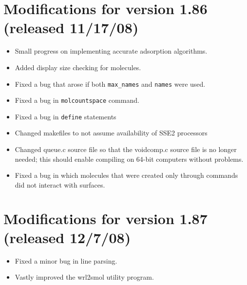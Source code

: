 \documentclass {scrbook}
\newcommand {\ttt} {\texttt}
\begin{document}
\section{Modifications for version 1.86 (released 11/17/08)}
\begin{itemize}
\item Small progress on implementing accurate adsorption algorithms.
\item Added display size checking for molecules.
\item Fixed a bug that arose if both \ttt{max\_names} and \ttt{names} were used.
\item Fixed a bug in \ttt{molcountspace} command.
\item Fixed a bug in \ttt{define} statements
\item Changed makefiles to not assume availability of SSE2 processors
\item Changed queue.c source file so that the voidcomp.c source file is no longer needed; this should enable compiling on 64-bit computers without problems.
\item Fixed a bug in which molecules that were created only through commands did not interact with surfaces.
\end{itemize}

\section{Modifications for version 1.87 (released 12/7/08)}
\begin{itemize}
\item Fixed a minor bug in line parsing.
\item Vastly improved the wrl2smol utility program.
\end{itemize}
\end{document}
